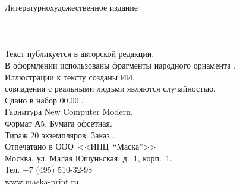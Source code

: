 \newpage
{
\null
\thispagestyle{plain}
}

{
\newpage
\thispagestyle{empty}
\begin{center}
{\small Литературно\sdash художественное издание}\\
\vspace{1.6cm}
{\Large \MyVarAuthorName}\\
\vspace{1.6cm}
{\Large\textbf\MyVarBookName}\\
\vspace{0.4cm}
{\large\textbf\MyVarBookNamesec}\\
\vspace{1.0cm}
{\small%
Текст публикуется в авторской редакции.\\
\vspace{1.0cm}
В оформлении использованы фрагменты народного орнамента \cite{КарельскаяВышивка,Королькова}.\\
Иллюстрации к тексту созданы ИИ,\\
совпадения с реальными людьми являются случайностью.\\
\vspace{1.5cm}
Сдано в набор 00.00.\year.\\
Гарнитура New Computer Modern.\\
Формат А5. Бумага офсетная.\\
Тираж 20 экземпляров. Заказ .\\
\vspace{1.0cm}
Отпечатано в ООО~<<ИПЦ~"`Маска"'>>\\
Москва, ул. Малая Юшуньская, д.~1, корп.~1.\\
Тел. +7 (495) 510-32-98\\
www.maska-print.ru
}
\end{center}
}